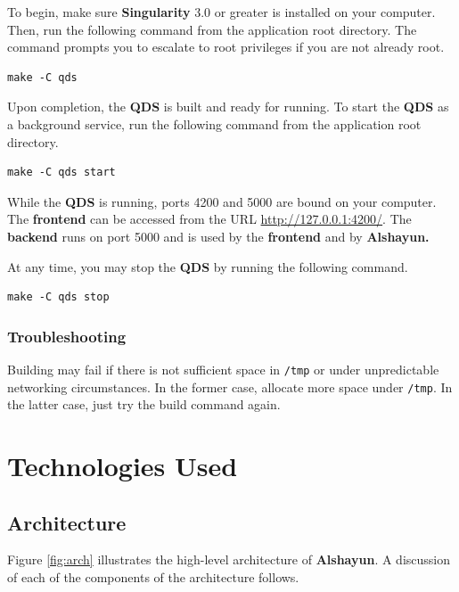 \documentclass[12pt]{report}
\begin{document}
To begin, make sure \textbf{Singularity} 3.0 \cite{singularity3inst} or greater
is installed on your computer. Then, run the following command from the
application root directory. The command prompts you to escalate to root
privileges if you are not already root.

\begin{verbatim}
make -C qds
\end{verbatim}

Upon completion, the \textbf{QDS} is built and ready for running. To start the
\textbf{QDS} as a background service, run the following command from the
application root directory.

\begin{verbatim}
make -C qds start
\end{verbatim}

While the \textbf{QDS} is running, ports 4200 and 5000 are bound on your
computer. The \textbf{frontend} can be accessed from the URL
\url{http://127.0.0.1:4200/}. The \textbf{backend} runs on port 5000 and is used
by the \textbf{frontend} and by \textbf{Alshayun.}

At any time, you may stop the \textbf{QDS} by running the following command.

\begin{verbatim}
make -C qds stop
\end{verbatim}

        \subsection{Troubleshooting}

Building may fail if there is not sufficient space in \texttt{/tmp} or under
unpredictable networking circumstances. In the former case, allocate more space
under \texttt{/tmp}. In the latter case, just try the build command again.

\chapter{Technologies Used}

    \section{Architecture}

Figure \ref{fig:arch} illustrates the high-level architecture of
\textbf{Alshayun}. A discussion of each of the components of the architecture
follows.
\end{document}
